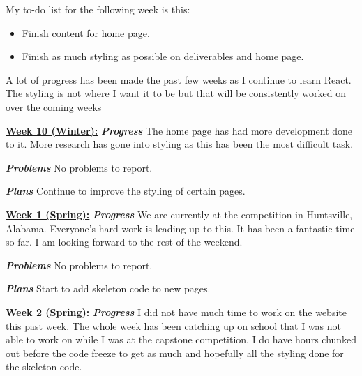 \documentclass[onecolumn, draftclsnofoot, 10pt, compsoc]{IEEEtran}
\begin{document}
My to-do list for the following week is this:
\begin{itemize}
    \item Finish content for home page.
    \item Finish as much styling as possible on deliverables and home page.
\end{itemize}
A lot of progress has been made the past few weeks as I continue to learn React. The styling is not where I want it to be but that will be consistently worked on over the coming weeks \newline 

\underline{\textbf{Week 10 (Winter):}}
\newline\textbf{\textit{{Progress}}} 
\newline The home page has had more development done to it. More research has gone into styling as this has been the most difficult task. \newline 

\textbf{\textit{{Problems}}}
\newline No problems to report. \newline  

\textbf{\textit{{Plans}}}
\newline Continue to improve the styling of certain pages. \newline   

\underline{\textbf{Week 1 (Spring):}}
\newline\textbf{\textit{{Progress}}}
\newline  We are currently at the competition in Huntsville, Alabama. Everyone's hard work is leading up to this. It has been a fantastic time so far. I am looking forward to the rest of the weekend. \newline 

\textbf{\textit{{Problems}}}
\newline No problems to report. \newline 

\textbf{\textit{{Plans}}}
\newline Start to add skeleton code to new pages. \newline 

\underline{\textbf{Week 2 (Spring):}}
\newline\textbf{\textit{{Progress}}}
\newline  I did not have much time to work on the website this past week. The whole week has been catching up on school that I was not able to work on while I was at the capstone competition. I do have hours chunked out before the code freeze to get as much and hopefully all the styling done for the skeleton code. \newline 
\end{document}
